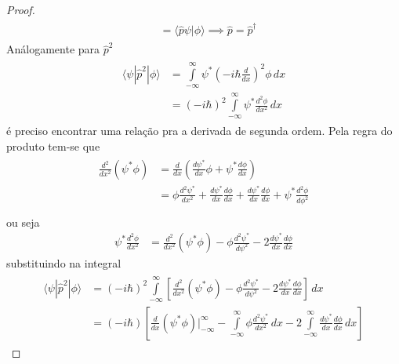 \begin{prob}
\begin{proof}
\begin{align}
\begin{split}
																							 &= \langle{\hat{p} \psi}|{\phi}\rangle\implies \boxed{\hat{p}=\hat{p}^{\dag}}
				 \end{split}
			 \end{align}
			 Análogamente para $\hat{p}^{2}$
			 \begin{align}
				 \begin{split}
					 \langle{\psi}|\hat{p}^{2}|{\phi}\rangle &= \int\limits_{-\infty}^{\infty} \psi^{*}\left(-i \hbar{}\frac{d}{dx}\right)^{2} \phi\,d{x}\\
																									 &= \left(-i \hbar{}\right)^{2}\int\limits_{-\infty}^{\infty} \psi^{*} \frac{d^{2} \phi}{dx^{2}}\,d{x}
				 \end{split}
			 \end{align}
			 é preciso encontrar uma relação pra a derivada de segunda ordem. Pela regra do produto tem-se que
			 \begin{align}
				 \begin{split}
					 \frac{d^{2}}{dx^{2}}\left(\psi^{*} \phi\right) &= \frac{d}{dx}\left(\frac{d \psi^{*}}{dx} \phi+\psi^{*} \frac{d \phi}{dx}\right)\\
																													&= \phi \frac{d^{2} \psi^{*}}{dx^{2}}+\frac{d \psi^{*}}{dx} \frac{d \phi}{dx}+\frac{d \psi^{*}}{dx} \frac{d \phi}{dx}+\psi^{*}\frac{d^{2} \phi}{d \phi^{2}}\\
				 \end{split}
			 \end{align}
			 ou seja
			 \begin{align}
				 \psi^{*} \frac{d^{2} \phi}{dx^{2}} &= \frac{d^{2}}{dx^{2}}\left(\psi^{*} \phi\right)-\phi \frac{d^{2} \psi^{*}}{d \psi^{2}}-2\frac{d \psi^{*}}{dx} \frac{d \phi}{dx}
			 \end{align}
			 substituindo na integral
			 \begin{align}
				 \begin{split}
					 \label{eq:q2-hermitiano_01}
					 \langle{\psi}|\hat{p}^{2}|{\phi}\rangle &= \left(-i \hbar{}\right)^{2}\int\limits_{-\infty}^{\infty}\left[\frac{d^{2}}{dx^{2}}\left(\psi^{*} \phi\right)-\phi \frac{d^{2} \psi^{*}}{d \psi^{2}}-2\frac{d \psi^{*}}{dx} \frac{d \phi}{dx}\right]\,d{x}\\
																									 &= \left(-i \hbar{}\right)\left[\frac{d}{dx}\left(\psi^{*} \phi\right)\Bigg|_{-\infty}^{\infty}-\int\limits_{-\infty}^{\infty} \phi \frac{d^{2} \psi^{*}}{dx^{2}}\,d{x}-2\int\limits_{-\infty}^{\infty}\frac{d \psi^{*}}{dx} \frac{d \phi}{dx}\,d{x}\right]
				 \end{split}

\end{align}
\end{proof}
\end{prob}
